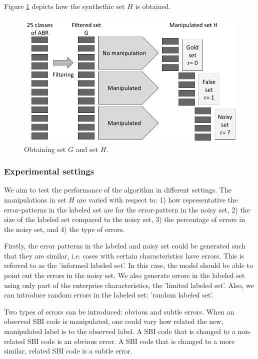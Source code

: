 \documentclass[12pt, a4paper, titlepage]{article}
\begin{document}
Figure \ref{fig1} depicts how the synthethic set $H$ is obtained.

\begin{figure}[h]
\includegraphics[width=\linewidth]{Synthethic set2}
\caption{Obtaining set $G$ and set $H$.}
\label{fig1}
\end{figure}

					\subsubsection{Experimental settings}
					\label{section:settings}


We aim to test the performance of the algorithm in different settings. The manipulations in set $H$ are varied with respect to: 1) how representative the error-patterns in the labeled set are for the error-pattern in the noisy set, 2) the size of the labeled set compared to the noisy set, 3) the percentage of errors in the noisy set, and 4) the type of errors. 

Firstly, the error patterns in the labeled and noisy set could be generated such that they are similar, i.e. cases with certain characteristics have errors. This is referred to as the 'informed labeled set'. In this case, the model should be able to point out the errors in the noisy set. We also generate errors in the labeled set using only part of the enterprise characteristics, the 'limited labeled set'. Also, we can introduce random errors in the labeled set: 'random labeled set'. 

Two types of errors can be introduced: obvious and subtle errors. When an observed SBI code is manipulated, one could vary how related the new, manipulated label is to the observed label. A SBI code that is changed to a non-related SBI code is an obvious error. A SBI code that is changed to a more similar, related SBI code is a subtle error.
\end{document}

